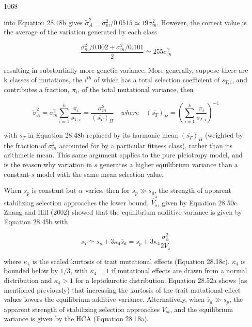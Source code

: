 \documentclass{article}
\begin{document}
1068

into Equation 28.48b gives  $ \widetilde{\sigma}_A^2 = \sigma_m^2 / 0.0515 \simeq 19\sigma_m^2 $. However, the correct value is the average of the variation generated by each class

\begin{equation}
\frac{\sigma_{m}^{2}/0.002+\sigma_{m}^{2}/0.101}{2}\simeq255\sigma_{m}^{2}
\end{equation}

resulting in substantially more genetic variance. More generally, suppose there are k classes of mutations, the  $ i^{th} $ of which has a total selection coefficient of  $ s_{T,i} $, and contributes a fraction,  $ \pi_{i} $, of the total mutational variance, then

\begin{equation}
\widetilde{\sigma}_{A}^{2}=\sigma_{m}^{2}\sum_{i=1}^{k}\frac{\pi_{i}}{s_{T,i}}=\frac{\sigma_{m}^{2}}{\left(\overline{s_{T}}\right)_{H}}\quad where\quad\left(\overline{s_{T}}\right)_{H}=\left(\sum_{i=1}^{k}\frac{\pi_{i}}{s_{T,i}}\right)^{-1}
\tag{28.51}
\label{eq:28_51}
\end{equation}

with $s_T$ in Equation 28.48b replaced by its harmonic mean $(\overline{s_T})_H$ (weighted by the fraction of $\sigma_m^2$ accounted for by a particular fitness class), rather than its arithmetic mean. This same argument applies to the pure pleiotropy model, and is the reason why variation in $s$ generates a higher equilibrium variance than a constant-$s$ model with the same mean selection value.

When $s_p$ is constant but $\alpha$ varies, then for $s_p \gg \overline{s}_d$, the strength of apparent stabilizing selection approaches the lower bound, $\widehat{V}_s^*$, given by Equation 28.50c. Zhang and Hill (2002) showed that the equilibrium additive variance is given by Equation 28.45b with

\begin{equation}
s_{T}\simeq s_{p}+3\kappa_{4}\overline{{s}}_{d}=s_{p}+3\kappa_{4}\frac{\sigma_{\alpha}^{2}}{2V_{s}}
\tag{28.52a}
\label{eq:28_52a}
\end{equation}

where  $ \kappa_4 $ is the scaled kurtosis of trait mutational effects (Equation 28.18c).  $ \kappa_4 $ is bounded below by  $ 1/3 $, with  $ \kappa_4 = 1 $ if mutational effects are drawn from a normal distribution and  $ \kappa_4 > 1 $ for a leptokurotic distribution. Equation 28.52a shows (as mentioned previously) that increasing the kurtosis of the trait mutational-effect values lowers the equilibrium additive variance. Alternatively, when  $ \bar{s}_d \gg s_p $, the apparent strength of stabilizing selection approaches  $ V_{st} $, and the equilibrium variance is given by the HCA (Equation 28.18a).
\end{document}
